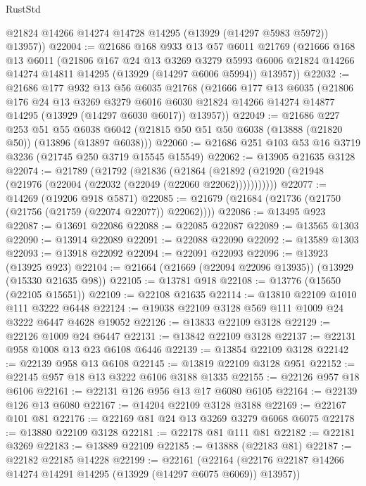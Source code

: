 \begin{lexlean}{RustStd}
\begin{coremodule}
        @21824
        @14266
        @14274
        @14728
        @14295
        (@13929 (@14297 @5983 @5972))
        @13957))
@22004 := @21686
    @168
    @933
    @13
    @57
    @6011
    @21769
    (@21666
      @168
      @13
      @6011
      (@21806
        @167
        @24
        @13
        @3269
        @3279
        @5993
        @6006
        @21824
        @14266
        @14274
        @14811
        @14295
        (@13929 (@14297 @6006 @5994))
        @13957))
@22032 := @21686
    @177
    @932
    @13
    @56
    @6035
    @21768
    (@21666
      @177
      @13
      @6035
      (@21806
        @176
        @24
        @13
        @3269
        @3279
        @6016
        @6030
        @21824
        @14266
        @14274
        @14877
        @14295
        (@13929 (@14297 @6030 @6017))
        @13957))
@22049 := @21686
    @227
    @253
    @51
    @55
    @6038
    @6042
    (@21815 @50 @51 @50 @6038 (@13888 (@21820 @50)) (@13896 (@13897 @6038)))
@22060 := @21686 @251 @103 @53 @16 @3719 @3236 (@21745 @250 @3719 @15545 @15549)
@22062 := @13905 @21635 @3128
@22074 := @21789
    (@21792
      (@21836
        (@21864 (@21892 (@21920 (@21948 (@21976 (@22004 (@22032 (@22049 (@22060 @22062)))))))))))
@22077 := @14269 (@19206 @918 @5871)
@22085 := @21679 (@21684 (@21736 (@21750 (@21756 (@21759 (@22074 @22077)) @22062))))
@22086 := @13495 @923
@22087 := @13691 @22086
@22088 := @22085 @22087
@22089 := @13565 @1303
@22090 := @13914 @22089
@22091 := @22088 @22090
@22092 := @13589 @1303
@22093 := @13918 @22092
@22094 := @22091 @22093
@22096 := @13923 (@13925 @923)
@22104 := @21664 (@21669 (@22094 @22096 @13935)) (@13929 (@15330 @21635 @98))
@22105 := @13781 @918
@22108 := @13776 (@15650 (@22105 @15651))
@22109 := @22108 @21635
@22114 := @13810 @22109 @1010 @111 @3222 @6448
@22124 := @19038 @22109 @3128 @569 @111 @1009 @24 @3222 @6447 @4628 @19052
@22126 := @13833 @22109 @3128
@22129 := @22126 @1009 @24 @6447
@22131 := @13842 @22109 @3128
@22137 := @22131 @958 @1008 @13 @23 @6108 @6446
@22139 := @13854 @22109 @3128
@22142 := @22139 @958 @13 @6108
@22145 := @13819 @22109 @3128 @951
@22152 := @22145 @957 @18 @13 @3222 @6106 @3188 @1335
@22155 := @22126 @957 @18 @6106
@22161 := @22131 @126 @956 @13 @17 @6080 @6105
@22164 := @22139 @126 @13 @6080
@22167 := @14204 @22109 @3128 @3188
@22169 := @22167 @101 @81
@22176 := @22169 @81 @24 @13 @3269 @3279 @6068 @6075
@22178 := @13880 @22109 @3128
@22181 := @22178 @81 @111 @81
@22182 := @22181 @3269
@22183 := @13889 @22109
@22185 := @13888 (@22183 @81)
@22187 := @22182 @22185 @14228
@22199 := @22161
    (@22164 (@22176 @22187 @14266 @14274 @14291 @14295 (@13929 (@14297 @6075 @6069)) @13957))

\end{coremodule}
\end{lexlean}
